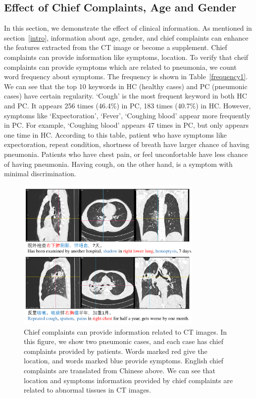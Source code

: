 \documentclass[journal]{IEEEtran}
\begin{document}
\subsection{Effect of Chief Complaints, Age and Gender}
\label{complaintsagegender}
In this section, we demonstrate the effect of clinical information.
As mentioned in section~\ref{intro}, information about age, gender, and chief complaints can enhance the features extracted from the CT image or become a supplement. Chief complaints can provide information like symptoms, location.
To verify that cheif complaints can provide symptoms which are related to pneumonia, we count word frequency about symptoms. The frequency is shown in Table~\ref{frequency1}. We can see that the top 10 keywords in HC (healthy cases) and PC (pneumonic cases) have certain regularity. `Cough' is the most frequent keyword in both HC and PC. It appears 256 times (46.4\%) in PC, 183 times (40.7\%) in HC. However, symptoms like `Expectoration', `Fever', `Coughing blood' appear more frequently in PC. For example, `Coughing blood' appears 47 times in PC, but only appears one time in HC. According to this table, patient who have symptoms like expectoration, repeat condition, shortness of breath have larger chance of having pneumonia. Patients who have chest pain, or feel unconfortable have less chance of having pneumonia. Having cough, on the other hand, is a symptom with minimal discrimination.

\begin{figure}[t]
    \centerline{\includegraphics[width=90mm]{txtpic.pdf}}
    \vspace{-0cm}
    \caption{Chief complaints can provide information related to CT images. In this figure, we show two pneumonic cases, and each case has chief complaints provided by patients. Words marked red give the location, and words marked blue provide symptoms. English chief complaints are translated from Chinese above. We can see that location and symptoms information provided by chief complaints are related to abnormal tissues in CT images.}
    \vspace{-0cm}
    \label{txtpic}
    \end{figure}
\end{document}
